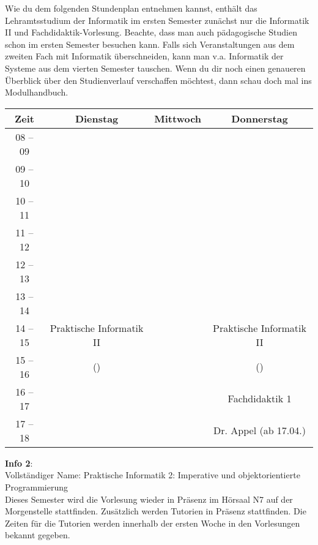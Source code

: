 Wie du dem folgenden Stundenplan entnehmen kannst, enthält das Lehramtsstudium der Informatik im ersten Semester zunächst nur die Informatik II und Fachdidaktik-Vorlesung.
Beachte, dass man auch pädagogische Studien schon im ersten Semester besuchen kann. Falls sich Veranstaltungen aus dem zweiten
Fach mit Informatik überschneiden, kann man v.a. Informatik der Systeme aus dem vierten Semester tauschen.
Wenn du dir noch einen genaueren Überblick über den Studienverlauf verschaffen möchtest, dann schau doch mal ins Modulhandbuch.

\begin{center}
	\begin{tabular}{|c|c|c|c|}
		\hline
		Zeit     & Dienstag                   & Mittwoch & Donnerstag               \\ \hline
		08 -- 09 &                            &          &                          \\ \hline
		09 -- 10 &                            &          &                          \\ \hline
		10 -- 11 &                            &          &                          \\ \hline
		11 -- 12 &                            &          &                          \\ \hline
		12 -- 13 &                            &          &                          \\ \hline
		13 -- 14 &                            &          &                          \\ \hline
		14 -- 15 & Praktische Informatik II   &          & Praktische Informatik II \\ \cline{1-1} \cline{3-3}
		15 -- 16 & (\Infoprof)                &          & (\Infoprof)              \\ \hline
		16 -- 17 &                            &          & Fachdidaktik 1           \\ \cline{1-3}
		17 -- 18 &                            &          & Dr. Appel (ab 17.04.)    \\ \hline
		\end{tabular}

\end{center}

\textbf{Info 2}:\\
Vollständiger Name: Praktische Informatik 2: Imperative und objektorientierte Programmierung\\
Dieses Semester wird die Vorlesung wieder in Präsenz im Hörsaal N7 auf der Morgenstelle stattfinden.
Zusätzlich werden Tutorien in Präsenz stattfinden.
Die Zeiten für die Tutorien werden innerhalb der ersten Woche in den Vorlesungen bekannt gegeben.\\

